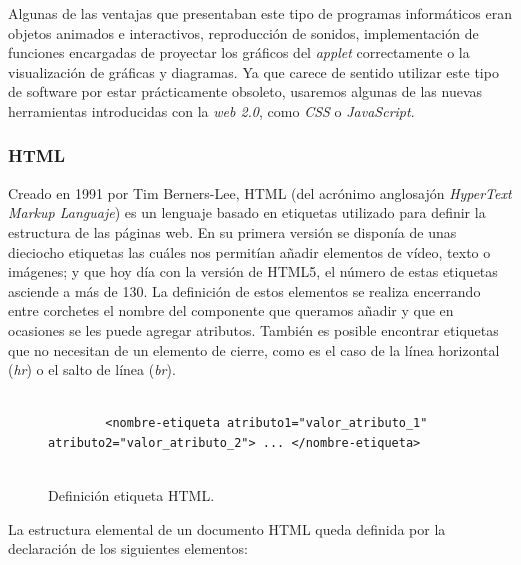 \documentclass[../main.tex]{subfiles}
\begin{document}
    Algunas de las ventajas que presentaban este tipo de programas informáticos eran objetos animados e interactivos, reproducción de sonidos, implementación de funciones encargadas de proyectar los gráficos del \textit{applet} correctamente o la visualización de gráficas y diagramas. Ya que carece de sentido utilizar este tipo de software por estar prácticamente obsoleto, usaremos algunas de las nuevas herramientas introducidas con la \textit{web 2.0}, como \textit{CSS} o \textit{JavaScript}.
    
    
    \subsubsection{HTML}
    Creado en 1991 por Tim Berners-Lee, HTML (del acrónimo anglosajón \textit{HyperText Markup Languaje}) es un lenguaje basado en etiquetas utilizado para definir la estructura de las páginas web. En su primera versión se disponía de unas dieciocho  etiquetas las cuáles nos permitían añadir elementos de vídeo, texto o imágenes; y que hoy día con la  versión de HTML5, el número de estas etiquetas asciende a más de 130. La definición de estos elementos se realiza encerrando entre corchetes el nombre del componente que queramos añadir y que en ocasiones se les puede agregar atributos. También es posible encontrar etiquetas que no necesitan de un elemento de cierre, como es el caso de la línea horizontal (\textit{hr}) o el salto de línea (\textit{br}). 
    
    
    \begin{figure}[!h]
        \centering
        \begin{verbatim}
        
        <nombre-etiqueta atributo1="valor_atributo_1" atributo2="valor_atributo_2"> ... </nombre-etiqueta>
        
        \end{verbatim}
        \caption{Definición etiqueta HTML.}
        \label{fig:definicion_etiqueta_html}
    \end{figure}
    
    La estructura elemental de un documento HTML queda definida por la declaración de los siguientes elementos:
\end{document}
